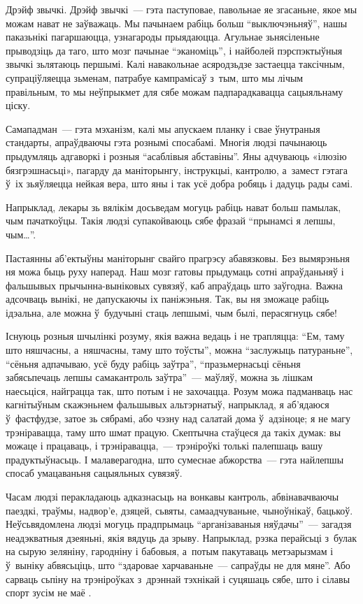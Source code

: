 Дрэйф звычкі. Дрэйф звычкі~--- гэта паступовае, павольнае яе згасаньне, якое мы можам нават не заўважаць. Мы пачынаем рабіць больш ``выключэньняў'', нашы паказьнікі пагаршаюцца, узнагароды прыядаюцца. Агульнае зьнясіленьне прыводзіць да таго, што мозг пачынае ``эканоміць'', і найболей пэрспэктыўныя звычкі зьлятаюць першымі. Калі навакольнае асяродзьдзе застаецца таксічным, супраціўляецца зьменам, патрабуе кампрамісаў з~тым, што мы лічым правільным, то мы неўпрыкмет для сябе можам падпарадкавацца сацыяльнаму ціску.

Самападман~--- гэта мэханізм, калі мы апускаем планку і свае ўнутраныя стандарты, апраўдваючы гэта рознымі спосабамі. Многія людзі пачынаюць прыдумляць адгаворкі і розныя ``асаблівыя абставіны''. Яны адчуваюць «ілюзію бязгрэшнасьці», пагарду да маніторынгу, інструкцыі, кантролю, а~замест гэтага ў~іх зьяўляецца нейкая вера, што яны і так усё добра робяць і дадуць рады самі.

Напрыклад, лекары зь вялікім досьведам могуць рабіць нават больш памылак, чым пачаткоўцы. Такія людзі супакойваюць сябе фразай ``прынамсі я лепшы, чым…''.

Пастаянны аб'ектыўны маніторынг свайго прагрэсу абавязковы. Без вымярэньня ня можа быць руху наперад. Наш мозг гатовы прыдумаць сотні апраўданьняў і фальшывых прычынна-выніковых сувязяў, каб апраўдаць што заўгодна. Важна адсочваць вынікі, не дапускаючы іх паніжэньня. Так, вы ня зможаце рабіць ідэальна, але можна ў~будучыні стаць лепшымі, чым былі, перасягнуць сябе!

Існуюць розныя шчылінкі розуму, якія важна ведаць і не трапляцца: ``Ем, таму што няшчасны, а~няшчасны, таму што тоўсты'', можна ``заслужыць патураньне'', ``сёньня адпачываю, усё буду рабіць заўтра'', ``празьмернасьці сёньня забясьпечаць лепшы самакантроль заўтра''~--- маўляў, можна зь лішкам наесьціся, найграцца так, што потым і не захочацца. Розум можа падманваць нас кагнітыўным скажэньнем фальшывых альтэрнатыў, напрыклад, я аб'ядаюся ў~фастфудзе, затое зь сябрамі, або чэзну над салатай дома ў~адзіноце; я не магу трэніравацца, таму што шмат працую. Скептычна стаўцеся да такіх думак: вы можаце і працаваць, і трэніравацца,~--- трэніроўкі толькі палепшаць вашу прадуктыўнасьць. І малаверагодна, што сумеснае абжорства~--- гэта найлепшы спосаб умацаваньня сацыяльных сувязяў.

Часам людзі перакладаюць адказнасьць на вонкавы кантроль, абвінавачваючы паездкі, траўмы, надвор'е, дзяцей, сьвяты, самаадчуваньне, чыноўнікаў, бацькоў. Неўсьвядомлена людзі могуць прадпрымаць ``арганізаваныя няўдачы''~--- загадзя неадэкватныя дзеяньні, якія вядуць да зрыву. Напрыклад, рэзка перайсьці з~булак на сырую зеляніну, гародніну і бабовыя, а~потым пакутаваць метэарызмам і ў~выніку абвясьціць, што ``здаровае харчаваньне~--- сапраўды не для мяне''. Або сарваць сьпіну на трэніроўках з~дрэннай тэхнікай і суцяшаць сябе, што і сілавы спорт зусім не маё .

